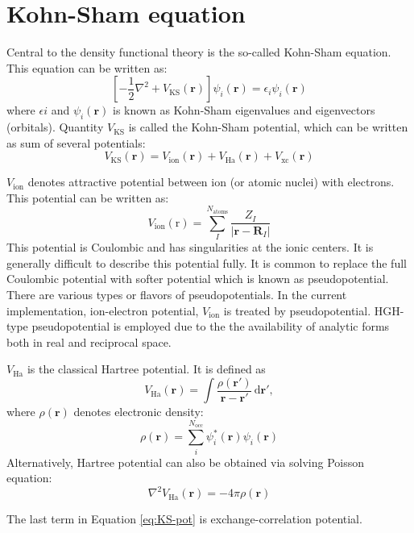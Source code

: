 \section{Kohn-Sham equation}

Central to the density functional theory is the so-called Kohn-Sham
equation.
This equation can be written as:
\begin{equation}
\left[
-\frac{1}{2}\nabla^2  + V_{\mathrm{KS}}(\mathbf{r})
\right] \psi_{i}(\mathbf{r}) =
\epsilon_{i}\psi_{i}(\mathbf{r})
\end{equation}
where $\epsilon{i}$ and $\psi_{i}(\mathbf{r})$ is known as Kohn-Sham
eigenvalues and eigenvectors (orbitals).
Quantity $V_{\mathrm{KS}}$ is called the Kohn-Sham potential, which can be
written as sum of several potentials:
\begin{equation}
V_{\mathrm{KS}}(\mathbf{r}) = V_{\mathrm{ion}}(\mathbf{r}) + V_{\mathrm{Ha}}(\mathbf{r})
+ V_{\mathrm{xc}}(\mathbf{r})
\label{eq:KS-pot}
\end{equation}

$V_{\mathrm{ion}}$ denotes attractive potential between ion (or atomic nuclei)
with electrons. This potential can be written as:
\begin{equation}
V_{\mathrm{ion}}(\mathrm{r}) =
\sum_{I}^{N_{\mathrm{atoms}}}
\frac{Z_{I}}{ \left| \mathbf{r} - \mathbf{R}_{I} \right| }
\end{equation}
This potential is Coulombic and has singularities
at the ionic centers. It is generally difficult to describe this
potential fully. It is common to replace the full Coulombic potential
with softer potential which is known as pseudopotential.
There are various types or flavors of pseudopotentials.
In the current implementation, ion-electron potential, $V_{\mathrm{ion}}$
is treated by pseudopotential. HGH-type pseudopotential is employed due to the
the availability of analytic forms both in real and reciprocal space.

$V_{\mathrm{Ha}}$ is the classical Hartree potential. It is defined as
\begin{equation}
V_{\mathrm{Ha}}(\mathbf{r}) = \int
\frac{\rho(\mathbf{r}')}
{\mathbf{r} - \mathbf{r}'}\,\mathrm{d}\mathbf{r}',
\end{equation}
where $\rho(\mathbf{r})$ denotes electronic density:
\begin{equation}
\rho(\mathbf{r}) = \sum_{i}^{N_{\mathrm{occ}}}
\psi^{*}_{i}(\mathbf{r}) \psi_{i}(\mathbf{r})
\end{equation}
Alternatively, Hartree potential can also be obtained via solving Poisson equation:
\begin{equation}
\nabla^{2} V_{\mathrm{Ha}}(\mathbf{r}) = -4\pi \rho(\mathbf{r})
\end{equation}

The last term in Equation \eqref{eq:KS-pot} is exchange-correlation potential.


